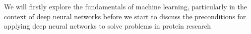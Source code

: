 We will firstly explore the fundamentals of machine learning, particularly in the context of deep neural networks before we start to discuss the preconditions for applying deep neural networks to solve problems in protein research